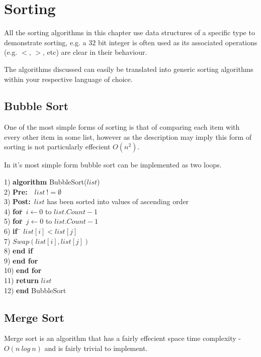 \chapter{Sorting}
All the sorting algorithms in this chapter use data structures of a specific type to demonstrate sorting, e.g. a $32$ bit integer is often used as its associated operations (e.g. $<$, $>$, etc) are clear in their behaviour.

The algorithms discussed can easily be translated into generic sorting algorithms within your respective language of choice.

\section{Bubble Sort}
One of the most simple forms of sorting is that of comparing each item with every other item in some list, however as the description may imply this form of sorting is not particularly effecient $O(n^{2})$.

In it's most simple form bubble sort can be implemented as two loops.

\begin{tabbing}
1)  \textbf{alg}\= \textbf{orithm} BubbleSort($list$) \\
2)  \> \textbf{Pre:}~~$list~!= \emptyset$ \\
3)  \> \textbf{Post:}~$list$ has been sorted into values of ascending order \\
4)  \> \textbf{for}\=~$i \leftarrow 0$ to $list.Count - 1$ \\
5)  \> \> \textbf{for}\=~$j \leftarrow 0$ to $list.Count - 1$ \\
6)  \> \> \> \textbf{if}~\= $list[i] < list[j]$ \\
7)  \> \> \> \> $Swap(list[i], list[j])$ \\
8)  \> \> \> \textbf{end if} \\
9)  \> \> \textbf{end for} \\
10) \> \textbf{end for} \\
11) \> \textbf{return} $list$ \\
12) \textbf{end} BubbleSort
\end{tabbing}

\newpage
\section{Merge Sort}
Merge sort is an algorithm that has a fairly effecient space time complexity - $O(n~log~n)$ and is fairly trivial to implement.

